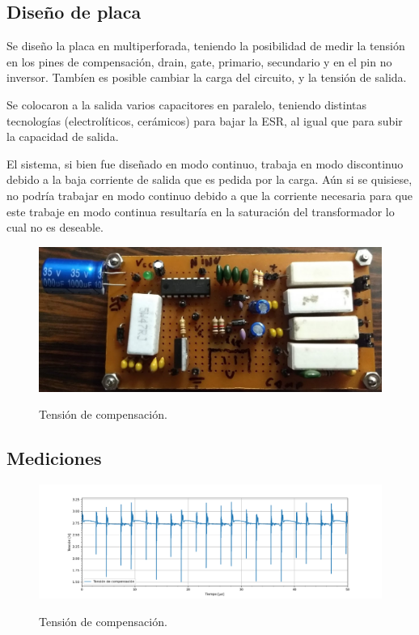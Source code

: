 %
%
%

\subsection{Diseño de placa}
Se diseño la placa en multiperforada, teniendo la posibilidad de medir la tensión en los pines de compensación, drain, gate, primario, secundario y en el pin no inversor. Tambíen es posible cambiar la carga del circuito, y la tensión de salida.

Se colocaron a la salida varios capacitores en paralelo, teniendo distintas tecnologías (electrolíticos, cerámicos) para bajar la ESR, al igual que para subir la capacidad de salida. 

El sistema, si bien fue diseñado en modo continuo, trabaja en modo discontinuo debido a la baja corriente de salida que es pedida por la carga. Aún si se quisiese, no podría trabajar en modo continuo debido a que la corriente necesaria para que este trabaje en modo continua resultaría en la saturación del transformador lo cual no es deseable.

\begin{figure}[H]
	\centering
	\includegraphics[width=0.7\linewidth]{ImagenesParteIV/placa_facha.png}
	\label{fig:vcom_4}
	\caption{Tensión de compensación.}
\end{figure}


\subsection{Mediciones}

\begin{figure}[H]
	\centering
	\includegraphics[width=0.9\linewidth]{ImagenesParteIV/Vcom.png}
	\label{fig:vcom_4}
	\caption{Tensión de compensación.}
\end{figure}


